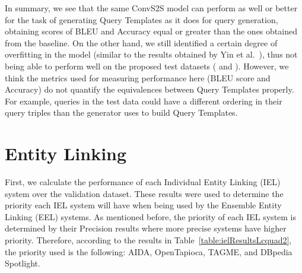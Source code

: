 In summary, we see that the same ConvS2S model can perform as well or better for the task of 
generating Query Templates as it does for \SPARQL{} query generation, obtaining scores of BLEU and 
Accuracy equal or greater than the ones obtained from the baseline. On the other hand, we still 
identified a certain degree of overfitting in the model (similar to the results obtained by 
Yin et al.~\cite{nmt:nl-to-sparql-Yin19}), thus not being able to perform well on the proposed 
test datasets (\QALDseven{} and \WikiSPARQL{}). However, we think the metrics used for measuring 
performance here (BLEU score and Accuracy) do not quantify the equivalences between Query 
Templates properly. For example, queries in the test data could have a different ordering in 
their query triples than the generator uses to build Query Templates.

\section{Entity Linking}
\label{cap5:results/entityLinking}
First, we calculate the performance of each Individual Entity Linking (IEL) system over the 
validation \LCQuADtwo{} dataset. These results were used to determine the priority each IEL system 
will have when being used by the Ensemble Entity Linking (EEL) systems. As mentioned before, the 
priority of each IEL system is determined by their Precision results where more precise systems 
have higher priority. Therefore, according to the results in Table~\ref{table:ielResultsLcquad2}, 
the priority used is the following: AIDA, OpenTapioca, TAGME, and DBpedia Spotlight.

